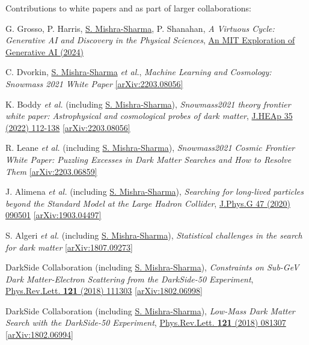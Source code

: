 \documentclass[letterpaper,11pt]{article}
\newenvironment{packed_enumerate}[1][]{
\begin{etaremune}[#1]
  \setlength{\itemsep}{4.0pt}
  \setlength{\parskip}{0pt}
  \setlength{\parsep}{0pt}}{\end{etaremune}
}
\begin{document}
\vspace{2mm}

\noindent
Contributions to white papers and as part of larger collaborations:

\begin{packed_enumerate}[start=8]

\item G. Grosso, P. Harris, \underline{S. Mishra-Sharma}, P. Shanahan, \emph{A Virtuous Cycle: Generative AI and Discovery in the Physical Sciences}, \href{https://doi.org/10.21428/e4baedd9.70ae2021}{An MIT Exploration of Generative AI (2024)}

  \item C. Dvorkin, \underline{S. Mishra-Sharma} \emph{et al.}, \emph{Machine Learning and Cosmology: Snowmass 2021 White Paper} \href{https://arxiv.org/abs/2203.08056}{[arXiv:2203.08056]}

  \item K. Boddy \emph{et al.} (including \underline{S. Mishra-Sharma}), \emph{Snowmass2021 theory frontier white paper: Astrophysical and cosmological probes of dark matter},  \href{https://www.sciencedirect.com/science/article/pii/S2214404822000349}{J.HEAp 35 (2022) 112-138}  \href{https://arxiv.org/abs/2203.08056}{[arXiv:2203.08056]}

  \item R. Leane \emph{et al.} (including \underline{S. Mishra-Sharma}), \emph{Snowmass2021 Cosmic Frontier White Paper: Puzzling Excesses in Dark Matter Searches and How to Resolve Them} \href{https://arxiv.org/abs/2203.06859}{[arXiv:2203.06859]}

  \item J. Alimena \emph{et al.} (including \underline{S. Mishra-Sharma}), \emph{Searching for long-lived particles beyond the Standard Model at the Large Hadron Collider}, \href{https://iopscience.iop.org/article/10.1088/1361-6471/ab4574}{J.Phys.G 47 (2020) 090501} \href{https://arxiv.org/abs/1903.04497}{[arXiv:1903.04497]}

  \item S. Algeri \emph{et al.} (including \underline{S. Mishra-Sharma}), \emph{Statistical challenges in the search for dark matter} \href{https://arxiv.org/abs/1807.09273}{[arXiv:1807.09273]}

  \item DarkSide Collaboration (including \underline{S. Mishra-Sharma}), \emph{Constraints on Sub-GeV Dark Matter-Electron Scattering from the DarkSide-50 Experiment}, \href{https://journals.aps.org/prl/abstract/10.1103/PhysRevLett.121.111303}{Phys.Rev.Lett. \textbf{121} (2018) 111303} \href{https://arxiv.org/abs/1802.06998}{[arXiv:1802.06998]}

  \item DarkSide Collaboration (including \underline{S. Mishra-Sharma}), \emph{Low-Mass Dark Matter Search with the DarkSide-50 Experiment}, \href{https://journals.aps.org/prl/abstract/10.1103/PhysRevLett.121.081307}{Phys.Rev.Lett. \textbf{121} (2018) 081307}  \href{https://arxiv.org/abs/1802.06994}{[arXiv:1802.06994]}
\end{packed_enumerate}
\end{document}
